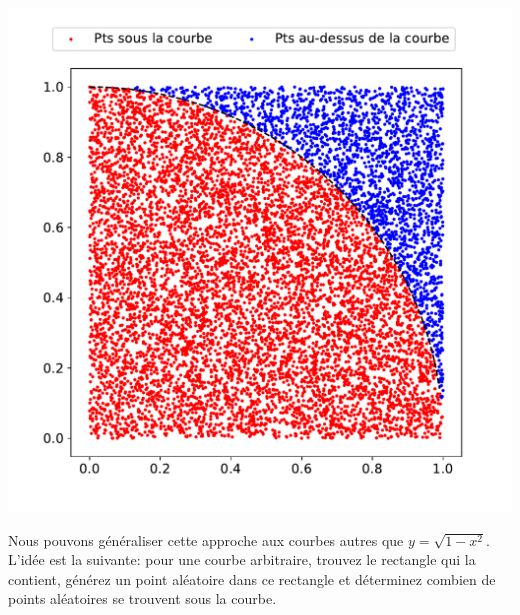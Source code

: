\documentclass[%
oneside,                 %
final,                   %
10pt]{article}
\begin{document}
\centerline{\includegraphics[width=0.7\linewidth]{imgs/MC_integral.pdf}}

\vspace{6mm}



Nous pouvons généraliser cette approche aux courbes autres que $y = \sqrt{1-x^2}$. L'idée est la suivante: pour une courbe arbitraire, trouvez le rectangle qui la contient, générez un point aléatoire dans ce rectangle et déterminez combien de points aléatoires se trouvent sous la courbe.


\end{document}

